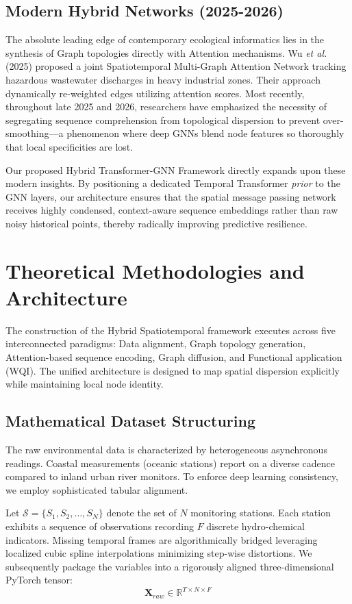 \documentclass[journal,10pt,twocolumn]{IEEEtran}
\begin{document}
\subsection{Modern Hybrid Networks (2025-2026)}
The absolute leading edge of contemporary ecological informatics lies in the synthesis of Graph topologies directly with Attention mechanisms. Wu \textit{et al.} (2025) proposed a joint Spatiotemporal Multi-Graph Attention Network tracking hazardous wastewater discharges in heavy industrial zones. Their approach dynamically re-weighted edges utilizing attention scores.
Most recently, throughout late 2025 and 2026, researchers have emphasized the necessity of segregating sequence comprehension from topological dispersion to prevent over-smoothing—a phenomenon where deep GNNs blend node features so thoroughly that local specificities are lost.

Our proposed Hybrid Transformer-GNN Framework directly expands upon these modern insights. By positioning a dedicated Temporal Transformer \textit{prior} to the GNN layers, our architecture ensures that the spatial message passing network receives highly condensed, context-aware sequence embeddings rather than raw noisy historical points, thereby radically improving predictive resilience.

\section{Theoretical Methodologies and Architecture}

The construction of the Hybrid Spatiotemporal framework executes across five interconnected paradigms: Data alignment, Graph topology generation, Attention-based sequence encoding, Graph diffusion, and Functional application (WQI). The unified architecture is designed to map spatial dispersion explicitly while maintaining local node identity.

\subsection{Mathematical Dataset Structuring}
The raw environmental data is characterized by heterogeneous asynchronous readings. Coastal measurements (oceanic stations) report on a diverse cadence compared to inland urban river monitors. To enforce deep learning consistency, we employ sophisticated tabular alignment.

Let $\mathcal{S} = \{S_1, S_2, \dots, S_N\}$ denote the set of $N$ monitoring stations. Each station exhibits a sequence of observations recording $F$ discrete hydro-chemical indicators. Missing temporal frames are algorithmically bridged leveraging localized cubic spline interpolations minimizing step-wise distortions. 
We subsequently package the variables into a rigorously aligned three-dimensional PyTorch tensor:
\begin{equation}
\mathbf{X}_{raw} \in \mathbb{R}^{T \times N \times F}
\end{equation}
\end{document}

